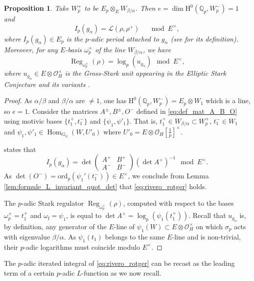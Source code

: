 \documentclass[12pt]{amsart}
\newcommand\bQ{\mathbb{Q}}
\newcommand\Qp{{\mathbb{Q}_p}}
\newcommand\cL{\mathcal{L}}
\newcommand\cO{\mathcal{O}}
\newcommand{\ord}{\mathrm{ord}}
\DeclareMathOperator{\Hom}{Hom}
\DeclareMathOperator{\Reg}{Reg}
\newcommand{\HH}{\mathrm{H}}
\newcommand{\ff}{\mathrm{f}}
\theoremstyle{defstyle}
\theoremstyle{thmstyle}
\newtheorem{proposition}[subsubsection]{Proposition}
\begin{document}
\begin{proposition}\label{prop:rivero_rotger}
Take $W_p^+$ to be $E_p \otimes_E W_{\beta/\alpha}$. Then $e=\dim \HH^0(\Qp,W_p^-)=1$ and
\begin{equation}\label{eq:rivero_rotger}
I_p(g_\alpha)=\cL(\rho,\rho^+) \quad \mod E^\times,
\end{equation}
where $I_p(g_\alpha)\in E_p$ is the $p$-adic period attached to $g_\alpha$ (see \cite[\S1]{riveroadjoint} for its definition). Moreover, for any $E$-basis $\omega_p^+$ of the line $W_{\beta/\alpha}$, we have
\begin{equation}\label{eq:gross-stark_unit}
	\Reg_{{\omega}^+_{p}}(\rho)= \log_p(u_{g_\alpha}) \mod E^\times,
\end{equation}
where $u_{g_\alpha}\in E\otimes \cO_H^\times$ is the Gross-Stark unit appearing in the Elliptic Stark Conjecture and its variants \cite{DLR1,DLR2}.
\end{proposition} 
\begin{proof}
As $\alpha/\beta$ and $\beta/\alpha$ are $\neq 1$, one has $\HH^0(\Qp,W_p^{-})=E_p\otimes W_1$ which is a line, so \(e=1\). Consider the matrices $A^\pm,B^\pm,O^-$ defined in \eqref{eq:def_mat_A_B_O} using motivic bases $\{t_1^+,t_1^-\}$ and $\{\psi_1,\psi'_1\}$. That is, $t_1^+\in W_{\beta/\alpha}\subset W_{p}^+$, $t_1^-\in W_1$ and $\psi_1,\psi'_1\in \Hom_{G_{\bQ}}(W,U'_0)$ where $U'_0=E \otimes \cO_H[\tfrac{1}{p}]^\times$. 

\cite[Thm. A]{riveroadjoint} states that 
$$I_p(g_\alpha)=\det \begin{pmatrix}A^+ & B^+ \\ A^- & B^- \end{pmatrix} (\det A^+)^{-1} \mod E^\times.$$
As $\det(O^-)=\ord_p(\psi_1'(t_1^-))\in E^\times$, we conclude from Lemma \ref{lem:formule_L_invariant_quot_det} that \eqref{eq:rivero_rotger} holds.

The $p$-adic Stark regulator $\Reg_{{\omega}^+_{p}}(\rho)$, computed with respect to the bases $\omega_{p}^+=t_1^+$ and $\omega_{\ff}=\psi_1$, is equal to $\det A^+=\log_p(\psi_1(t_1^+))$. Recall that $u_{g_\alpha}$ is, by definition, any generator of the $E$-line of $\psi_1(W)\subset E\otimes \cO_H^\times$ on which $\sigma_p$ acts with eigenvalue $\beta/\alpha$. As $\psi_1(t_1)$ belongs to the same $E$-line and is non-trivial, their $p$-adic logarithms must coincide modulo $E^\times$.
\end{proof}

The $p$-adic iterated integral of \eqref{eq:rivero_rotger} can be recast as the leading term of a certain $p$-adic $L$-function as we now recall.
\end{document}
